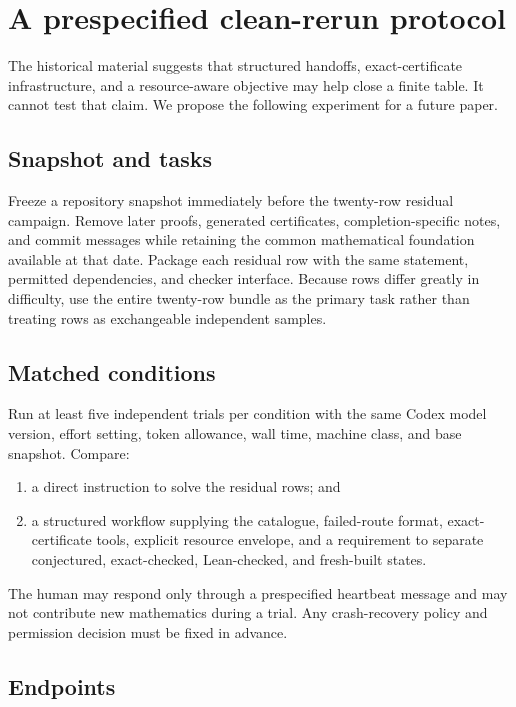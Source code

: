 \documentclass[11pt]{article}
\begin{document}
\section{A prespecified clean-rerun protocol}
\label{sec:rerun}

The historical material suggests that structured handoffs, exact-certificate
infrastructure, and a resource-aware objective may help close a finite table.
It cannot test that claim.  We propose the following experiment for a future
paper.

\subsection{Snapshot and tasks}

Freeze a repository snapshot immediately before the twenty-row residual
campaign.  Remove later proofs, generated certificates, completion-specific
notes, and commit messages while retaining the common mathematical foundation
available at that date.  Package each residual row with the same statement,
permitted dependencies, and checker interface.  Because rows differ greatly
in difficulty, use the entire twenty-row bundle as the primary task rather
than treating rows as exchangeable independent samples.

\subsection{Matched conditions}

Run at least five independent trials per condition with the same Codex model
version, effort setting, token allowance, wall time, machine class, and base
snapshot.  Compare:
\begin{enumerate}[leftmargin=2em]
 \item a direct instruction to solve the residual rows; and
 \item a structured workflow supplying the catalogue, failed-route format,
 exact-certificate tools, explicit resource envelope, and a requirement to
 separate conjectured, exact-checked, Lean-checked, and fresh-built states.
\end{enumerate}
The human may respond only through a prespecified heartbeat message and may
not contribute new mathematics during a trial.  Any crash-recovery policy and
permission decision must be fixed in advance.

\subsection{Endpoints}
\end{document}
